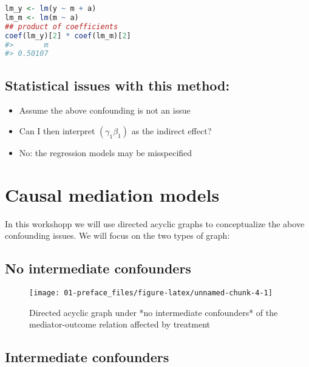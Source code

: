 \documentclass[
  12pt,
]{book}
\providecommand{\tightlist}{%
  \setlength{\itemsep}{0pt}\setlength{\parskip}{0pt}}
\theoremstyle{definition}
\theoremstyle{definition}
\theoremstyle{definition}
\newcommand{\1}{\mathbbm{1}}
\begin{document}
\begin{lstlisting}[language=R]
lm_y <- lm(y ~ m + a)
lm_m <- lm(m ~ a)
## product of coefficients
coef(lm_y)[2] * coef(lm_m)[2]
#>       m 
#> 0.50107
\end{lstlisting}

\hypertarget{statistical-issues-with-this-method}{%
\subsection{Statistical issues with this method:}\label{statistical-issues-with-this-method}}

\begin{itemize}
\tightlist
\item
  Assume the above confounding is not an issue
\item
  Can I then interpret \((\gamma_1\beta_1)\) as the indirect effect?
\item
  No: the regression models may be misspecified
\end{itemize}

\hypertarget{causal-mediation-models}{%
\section{Causal mediation models}\label{causal-mediation-models}}

In this workshopp we will use directed acyclic graphs to conceptualize the above
confounding issues. We will focus on the two types of graph:

\hypertarget{no-intermediate-confounders}{%
\subsection{No intermediate confounders}\label{no-intermediate-confounders}}

\begin{figure}

{\centering \texttt{[image: 01-preface\_files/figure-latex/unnamed-chunk-4-1]} 

}

\caption{Directed acyclic graph under *no intermediate confounders* of the mediator-outcome relation affected by treatment}\label{fig:unnamed-chunk-4}
\end{figure}

\hypertarget{intermediate-confounders}{%
\subsection{Intermediate confounders}\label{intermediate-confounders}}
\end{document}
